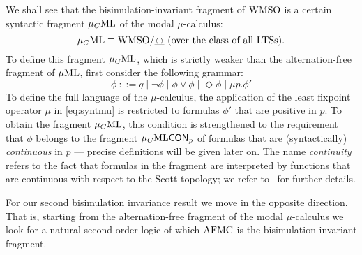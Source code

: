 We shall see that the bisimulation-invariant fragment of $\mathrm{WMSO}$ is 
a certain syntactic fragment $\mu_{C}\mathrm{ML}$ of the modal $\mu$-calculus:
\begin{equation}
\label{eq-main}
\mucML \equiv \wmso/{\bis}  \text{ (over the class of all LTSs)}.
\end{equation}
To define this fragment $\mu_{C}\mathrm{ML}$, which is strictly weaker than the 
alternation-free fragment of $\mu\mathrm{ML}$, first consider the following grammar:
\begin{equation}
\label{eq:syntmu}
\phi\ ::= q \mid \neg\phi \mid 
    \phi \lor \phi \mid  \Diamond \phi \mid
    \mu p.\phi' 
\end{equation}
To define the full language of the $\mu$-calculus, the application of the least
fixpoint operator $\mu$ in \eqref{eq:syntmu} is restricted to formulas $\phi'$ 
that are positive in $p$.
To obtain the fragment $\mu_{C}\mathrm{ML}$, this condition is strengthened to the 
requirement that $\phi$ belongs to the fragment $\mu_{C}\mathrm{ML}\mathsf{CON}_{p}$ of formulas
that are (syntactically) \emph{continuous} in $p$ --- precise definitions will
be given later on.
The name \emph{continuity} refers to the fact that formulas in the fragment are
interpreted by functions that are continuous with respect to the Scott topology;
we refer to~\cite{Fontaine08,FV12} for further details.

For our second bisimulation invariance result we move in the opposite 
direction.
That is, starting from the alternation-free fragment of the modal 
$\mu$-calculus we look for a natural second-order logic of which $\mathrm{AFMC}$ is the 
bisimulation-invariant fragment. 




